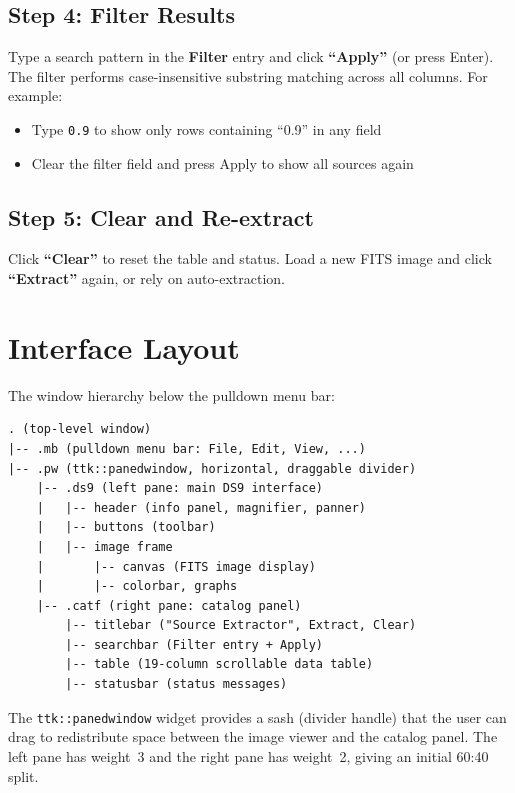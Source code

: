 \documentclass[11pt,fleqn]{book}
\begin{document}
\subsection{Step 4: Filter Results}

Type a search pattern in the \textbf{Filter} entry and click \textbf{``Apply''} (or press Enter). The filter performs case-insensitive substring matching across all columns. For example:
\begin{itemize}[leftmargin=2em]
  \item Type \texttt{0.9} to show only rows containing ``0.9'' in any field
  \item Clear the filter field and press Apply to show all sources again
\end{itemize}

\subsection{Step 5: Clear and Re-extract}

Click \textbf{``Clear''} to reset the table and status. Load a new FITS image and click \textbf{``Extract''} again, or rely on auto-extraction.


\section{Interface Layout}

The window hierarchy below the pulldown menu bar:

\begin{codebox}
\begin{lstlisting}[numbers=none]
. (top-level window)
|-- .mb (pulldown menu bar: File, Edit, View, ...)
|-- .pw (ttk::panedwindow, horizontal, draggable divider)
    |-- .ds9 (left pane: main DS9 interface)
    |   |-- header (info panel, magnifier, panner)
    |   |-- buttons (toolbar)
    |   |-- image frame
    |       |-- canvas (FITS image display)
    |       |-- colorbar, graphs
    |-- .catf (right pane: catalog panel)
        |-- titlebar ("Source Extractor", Extract, Clear)
        |-- searchbar (Filter entry + Apply)
        |-- table (19-column scrollable data table)
        |-- statusbar (status messages)
\end{lstlisting}
\end{codebox}

The \texttt{ttk::panedwindow} widget provides a sash (divider handle) that the user can drag to redistribute space between the image viewer and the catalog panel. The left pane has weight~3 and the right pane has weight~2, giving an initial 60:40 split.
\end{document}

